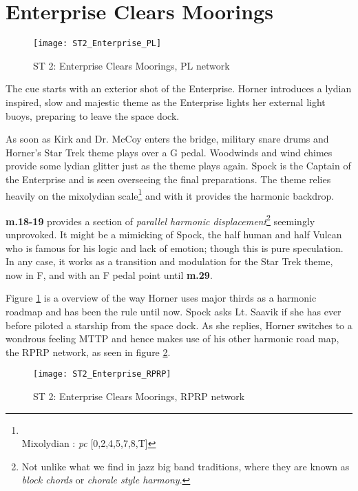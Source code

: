 \section{Enterprise Clears Moorings}
\begin{figure}[h!]
\center
\texttt{[image: ST2\_Enterprise\_PL]}
	\caption{ST 2: Enterprise Clears Moorings, PL network}
	\label{ST2_Enterprise_PL}
\end{figure}

\noindent The cue starts with an exterior shot of the Enterprise. Horner introduces a lydian inspired, slow and majestic theme as the Enterprise lights her external light buoys, preparing to leave the space dock. 

As soon as Kirk and Dr. McCoy enters the bridge, military snare drums and Horner's Star Trek theme plays over a G pedal. Woodwinds and wind chimes provide some lydian glitter just as the theme plays again. Spock is the Captain of the Enterprise and is seen overseeing the final preparations. The theme relies heavily on the mixolydian  scale\footnote{\\Mixolydian {}: \textit{pc} [0,2,4,5,7,8,T]} and with it provides the harmonic backdrop.

\textbf{m.18-19} provides a section of \textit{parallel harmonic displacement}\footnote{Not unlike what we find in jazz big band traditions, where they are known as \textit{block chords} or \textit{chorale style harmony}.} seemingly unprovoked. It might be a mimicking of Spock, the half human and half Vulcan who is famous for his logic and lack of emotion; though this is pure speculation. In any case, it works as a transition and modulation for the Star Trek theme, now in F, and with an F pedal point until \textbf{m.29}.  

Figure \ref{ST2_Enterprise_PL} is a overview of the way Horner uses major thirds as a harmonic roadmap and has been the rule until now. Spock asks Lt. Saavik if she has ever before piloted a starship from the space dock. As she replies, Horner switches to a wondrous feeling \acf{MTTP} and hence makes use of his other harmonic road map, the RPRP network, as seen in figure \ref{ST2_Enterprise_RPRP}.

\begin{figure}
\center
\texttt{[image: ST2\_Enterprise\_RPRP]}
	\caption{ST 2: Enterprise Clears Moorings, RPRP network}
	\label{ST2_Enterprise_RPRP}
\end{figure}


